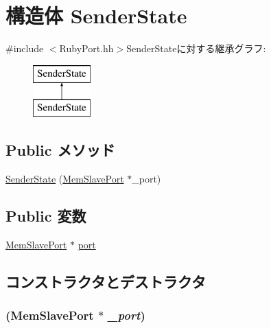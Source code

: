 \hypertarget{structRubyPort_1_1SenderState}{
\section{構造体 SenderState}
\label{structRubyPort_1_1SenderState}
}


{\ttfamily \#include $<$RubyPort.hh$>$}SenderStateに対する継承グラフ:\begin{figure}[H]
\begin{center}
\leavevmode
\includegraphics[height=2cm]{structRubyPort_1_1SenderState}
\end{center}
\end{figure}
\subsection*{Public メソッド}
\begin{DoxyCompactItemize}
\item 
\hyperlink{structRubyPort_1_1SenderState_a4fdc7606f1bb63160611ae0bdb03f8ac}{SenderState} (\hyperlink{classRubyPort_1_1MemSlavePort}{MemSlavePort} $\ast$\_\-port)
\end{DoxyCompactItemize}
\subsection*{Public 変数}
\begin{DoxyCompactItemize}
\item 
\hyperlink{classRubyPort_1_1MemSlavePort}{MemSlavePort} $\ast$ \hyperlink{structRubyPort_1_1SenderState_a82291d8c80c17c219acfb5f466c8516e}{port}
\end{DoxyCompactItemize}


\subsection{コンストラクタとデストラクタ}
\hypertarget{structRubyPort_1_1SenderState_a4fdc7606f1bb63160611ae0bdb03f8ac}{
\subsubsection[{SenderState}]{ ({\bf MemSlavePort} $\ast$ {\em \_\-port})}}
\label{structRubyPort_1_1SenderState_a4fdc7606f1bb63160611ae0bdb03f8ac}



